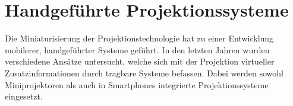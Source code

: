 



\section{Handgeführte Projektionssysteme}


Die Miniaturisierung der Projektionstechnologie hat zu einer Entwicklung mobilerer, handgeführter Systeme geführt. In den letzten Jahren wurden verschiedene Ansätze untersucht, welche sich mit der Projektion virtueller Zusatzinformationen durch tragbare Systeme befassen. Dabei werden sowohl Miniprojektoren als auch in Smartphones integrierte Projektionssysteme eingesetzt.\\

